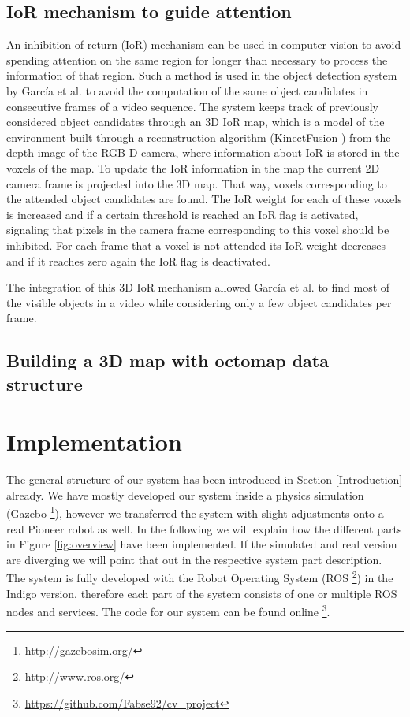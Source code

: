 \documentclass[a4paper,11pt,english]{article}
\begin{document}
\subsection{IoR mechanism to guide attention}
An inhibition of return (IoR) mechanism can be used in computer vision to avoid spending attention on the same region for longer than necessary to process the information of that region.
Such a method is used in the object detection system by García et al. \cite{garcia2015saliency} to avoid the computation of the same object candidates in consecutive frames of a video sequence.
The system keeps track of previously considered object candidates through an 3D IoR map, which is a model of the environment built through a reconstruction algorithm (KinectFusion \cite{newcombe2011kinectfusion}) from the depth image of the RGB-D camera, where information about IoR is stored in the voxels of the map.
To update the IoR information in the map the current 2D camera frame is projected into the 3D map.
That way, voxels corresponding to the attended object candidates are found.
The IoR weight for each of these voxels is increased and if a certain threshold is reached an IoR flag is activated, signaling that pixels in the camera frame corresponding to this voxel should be inhibited.
For each frame that a voxel is not attended its IoR weight decreases and if it reaches zero again the IoR flag is deactivated.

The integration of this 3D IoR mechanism allowed García et al. to find most of the visible objects in a video while considering only a few object candidates per frame.

\subsection{Building a 3D map with octomap data structure}

\section{Implementation}
\label{Implementation}

The general structure of our system has been introduced in Section \ref{Introduction} already.
We have mostly developed our system inside a physics simulation (Gazebo \footnote{\url{http://gazebosim.org/}}), however we transferred the system with slight adjustments onto a real Pioneer robot as well.
In the following we will explain how the different parts in Figure \ref{fig:overview} have been implemented. If the simulated and real version are diverging we will point that out in the respective system part description.
The system is fully developed with the Robot Operating System (ROS \footnote{\url{http://www.ros.org/}}) in the Indigo version, therefore each part of the system consists of one or multiple ROS nodes and services.
The code for our system can be found online \footnote{\url{https://github.com/Fabse92/cv_project}}.
\end{document}
